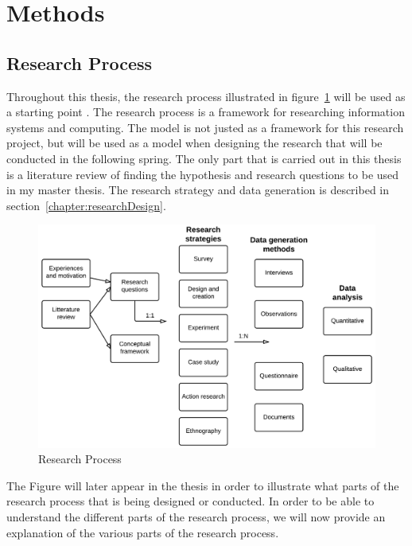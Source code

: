  \section{Methods} \label{sec:methods}

    \subsection{Research Process} \label{sec:methodresearchprocess}

    Throughout this thesis, the research process illustrated in figure~\ref{fig:researchProcess1} will be used as a starting point \cite{empiriske}. The research process is a framework for researching information systems and computing. The model is not justed as a framework for this research project, but will be used as a model when designing the research that will be conducted in the following spring. The only part that is carried out in this thesis is a literature review of finding the hypothesis and research questions to be used in my master thesis. The research strategy and data generation is described in section~\ref{chapter:researchDesign}.

      \begin{figure}[H]
        \centering
        \includegraphics[scale=0.18]{pics/ResearchProcess.png}
        \caption[Research process]{Research Process \cite{empiriske}}
        \label{fig:researchProcess1}
      \end{figure}

    The Figure will later appear in the thesis in order to illustrate what parts of the research process that is being designed or conducted. In order to be able to understand the different parts of the research process, we will now provide an explanation of the various parts of the research process.

